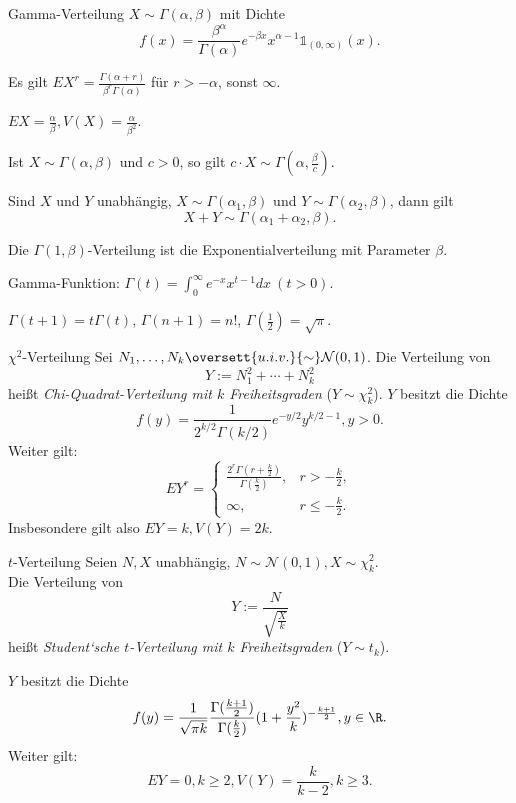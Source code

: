 \begin{karte}{Gamma-Verteilung}
    \(X \sim \Gamma(\alpha, \beta)\) mit Dichte 
    \[ f(x) = \frac{\beta^\alpha}{\Gamma(\alpha)} e^{-\beta x} x^{\alpha - 1} \mathds{1}_{(0,\infty)}(x). \]
    
    Es gilt \(E X^r = \frac{\Gamma(\alpha + r)}{\beta^r \Gamma(\alpha)}\) für \(r > -\alpha\), sonst \(\infty\).
    
    \(E X = \frac{\alpha}{\beta}, V(X) = \frac{\alpha}{\beta^2}\).

    Ist \(X \sim \Gamma(\alpha, \beta)\) und \(c>0\), so gilt \(c\cdot X \sim \Gamma(\alpha, \frac{\beta}{c})\).
    
    Sind \(X\) und \(Y\) unabhängig, \(X \sim \Gamma(\alpha_1, \beta)\) und \(Y \sim \Gamma(\alpha_2, \beta)\), dann gilt 
    \[ X + Y \sim \Gamma(\alpha_1 + \alpha_2, \beta). \]

    Die \(\Gamma(1, \beta)\)-Verteilung ist die Exponentialverteilung mit Parameter \(\beta\).

    Gamma-Funktion: \(\Gamma(t) = \int_0^\infty e^{-x} x^{t-1} dx \ (t>0)\). 

    \(\Gamma(t+1) = t\Gamma(t)\),
    \(\Gamma(n+1) = n!\),
    \(\Gamma(\frac{1}{2}) = \sqrt{\pi}\).
\end{karte}

\begin{karte}{\(\chi^2\)-Verteilung}
Sei \(N_1, \ldots, N_k \oversett{u.i.v.}{\sim} \mathcal{N}(0,1)\). Die Verteilung von 
\[ Y := N_1^2 + \cdots + N_k^2 \]
heißt \textit{Chi-Quadrat-Verteilung mit \(k\) Freiheitsgraden} (\(Y \sim \chi_k^2\)).
\(Y\) besitzt die Dichte 
\[ f(y) = \frac{1}{2^{k/2} \Gamma(k/2)} e^{-y/2} y^{k/2-1}, y>0. \]
Weiter gilt: 
\[ E Y^r = \begin{cases}
    \frac{2^r \Gamma(r+\frac{k}{2})}{\Gamma(\frac{k}{2})}, &r > - \frac{k}{2}, \\
    \infty, & r \leq -\frac{k}{2}.
\end{cases} \]
Insbesondere gilt also \(E Y = k, V(Y) = 2k\).
\end{karte}

\begin{karte}{\(t\)-Verteilung}
Seien \(N,X\) unabhängig, \(N \sim \mathcal{N}(0,1), X \sim \chi_k^2\).\\
Die Verteilung von 
\[ Y := \frac{N}{\sqrt{\frac{X}{k}}} \]
heißt \textit{Student`sche \(t\)-Verteilung mit \(k\) Freiheitsgraden} (\(Y \sim t_k\)).

\(Y\) besitzt die Dichte 
\[ f(y) = \frac{1}{\sqrt{\pi k}} \frac{\Gamma(\frac{k+1}{2})}{\Gamma(\frac{k}{2})} (1 + \frac{y^2}{k})^{-\frac{k+1}{2}}, y \in \R. \]
Weiter gilt: 
\[ E Y = 0, k \geq 2, V(Y) = \frac{k}{k-2}, k \geq 3. \]
\end{karte}

